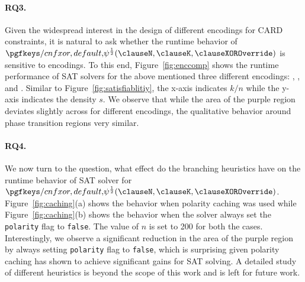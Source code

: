 \paragraph{\bf{RQ3.}}Given the widespread interest in the design of different encodings for CARD constraints, it is natural to ask whether the runtime behavior of $\FQ$ is sensitive to encodings. To this end, Figure~\ref{fig:enccomp} shows the runtime performance of SAT solvers for the above mentioned three different encodings: \adder, \bdd, and \cardnet. Similar to Figure~\ref{fig:satisfiablitiy}, the x-axis indicates  $k/n$ while the y-axis indicates the density $s$. We observe that while the area of the purple region deviates slightly across for different encodings, the qualitative behavior around phase transition regions very similar. 





 \paragraph{\bf{RQ4.}} We now turn to the question, what effect do the branching heuristics have on the runtime behavior of SAT solver for $\FQ$. Figure~\ref{fig:caching}(a) shows the behavior when polarity caching was used while Figure~\ref{fig:caching}(b) shows the behavior when the solver always set the {\tt polarity} flag to {\tt false}. The value of $n$ is set to 200 for both the cases. Interestingly, we observe a significant reduction in the area of the purple region by always setting {\tt polarity} flag to {\tt false}, which is surprising given polarity caching has shown to achieve significant gains for SAT solving. A detailed study of different heuristics is beyond the scope of this work and is left for future work.

